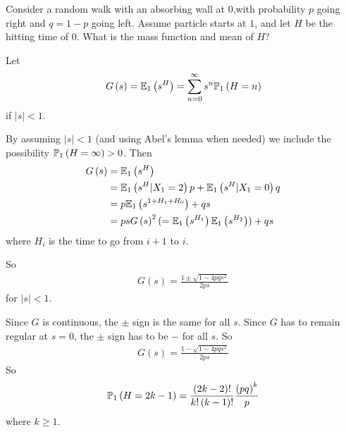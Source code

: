 \documentclass[a4paper]{article}
\begin{document}
\begin{eg}
Consider a random walk with an absorbing wall at $0$,with probability $p$ going right and $q=1-p$ going left. Assume particle starts at $1$, and let $H$ be the hitting time of $0$. What is the mass function and mean of $H$?

Let
\begin{equation*}
\begin{aligned}
G\left(s\right) = \E_1\left(s^H\right) = \sum_{n=0}^\infty s^n \P_1\left(H=n\right)
\end{aligned}
\end{equation*}
if $|s|<1$.

By assuming $|s|<1$ (and using Abel's lemma when needed) we include the possibility $\P_1\left(H=\infty\right)>0$. Then
\begin{equation*}
\begin{aligned}
G\left(s\right) &= \E_1\left(s^H\right)\\
&= \E_1\left(s^H | X_1=2\right)p + \E_1\left(s^H | X_1 = 0\right)q\\
&= p\E_1\left(s^{1+H_1+H_0}\right)+qs\\
&= psG\left(s\right)^2(=\E_1\left(s^{H_1}\right)\E_1\left(s^{H_2}\right)) + qs
\end{aligned}
\end{equation*}
where $H_i$ is the time to go from $i+1$ to $i$.

So
\begin{equation*}
\begin{aligned}
G\left(s\right) = \frac{1 \pm \sqrt{1-4pqs^2}}{2ps}
\end{aligned}
\end{equation*}
for $|s|<1$.

Since $G$ is continuous, the $\pm$ sign is the same for all $s$. Since $G$ has to remain regular at $s=0$, the $\pm$ sign has to be $-$ for all $s$. So
\begin{equation*}
\begin{aligned}
G\left(s\right) = \frac{1-\sqrt{1-4pqs^2}}{2ps}
\end{aligned}
\end{equation*}
So
\begin{equation*}
\begin{aligned}
\P_1\left(H=2k-1\right)=\frac{\left(2k-2\right)!}{k!\left(k-1\right)!} \frac{\left(pq\right)^k}{p}
\end{aligned}
\end{equation*}
where $k \geq 1$.


\end{eg}
\end{document}
